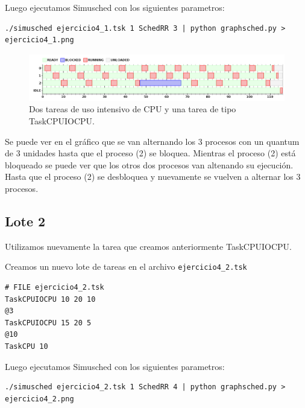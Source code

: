 Luego ejecutamos Simusched con los siguientes parametros:

\begin{framed}
\begin{verbatim}
./simusched ejercicio4_1.tsk 1 SchedRR 3 | python graphsched.py > ejercicio4_1.png
\end{verbatim}
\end{framed}

\begin{figure}[h!]
  \caption{Dos tareas de uso intensivo de CPU y una tarea de tipo TaskCPUIOCPU.}
  \centering
    \includegraphics[width=1\textwidth]{img/ejercicio4_1.png}
\end{figure}

Se puede ver en el gr\'afico que se van alternando los 3 procesos con un quantum de 3 unidades hasta que el proceso (2) se bloquea. Mientras el proceso (2) est\'a bloqueado se puede ver que los otros dos procesos van altenando su ejecuci\'on. Hasta que el proceso (2) se desbloquea y nuevamente se vuelven a alternar los 3 procesos.

\subsection{Lote 2}

Utilizamos nuevamente la tarea que creamos anteriormente TaskCPUIOCPU.

Creamos un nuevo lote de tareas en el archivo \verb|ejercicio4_2.tsk|

\begin{framed}
\begin{verbatim}
# FILE ejercicio4_2.tsk
TaskCPUIOCPU 10 20 10
@3
TaskCPUIOCPU 15 20 5
@10
TaskCPU 10
\end{verbatim}
\end{framed}

Luego ejecutamos Simusched con los siguientes parametros:

\begin{framed}
\begin{verbatim}
./simusched ejercicio4_2.tsk 1 SchedRR 4 | python graphsched.py > ejercicio4_2.png
\end{verbatim}
\end{framed}

